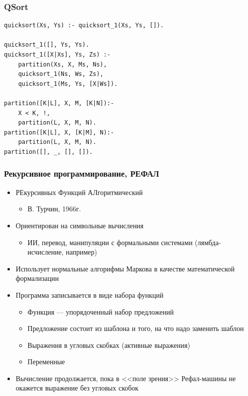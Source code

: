 \documentclass[xetex,mathserif,serif]{beamer}
\begin{document}
    \begin{frame}[fragile]
        \frametitle{QSort}
        \begin{verbatim}
quicksort(Xs, Ys) :- quicksort_1(Xs, Ys, []).

quicksort_1([], Ys, Ys).
quicksort_1([X|Xs], Ys, Zs) :-
    partition(Xs, X, Ms, Ns),
    quicksort_1(Ns, Ws, Zs),
    quicksort_1(Ms, Ys, [X|Ws]).
 
partition([K|L], X, M, [K|N]):-
    X < K, !,
    partition(L, X, M, N).
partition([K|L], X, [K|M], N):-
    partition(L, X, M, N).
partition([], _, [], []).
        \end{verbatim}
    \end{frame}

    \begin{frame}
        \frametitle{Рекурсивное программирование, РЕФАЛ}
        \begin{itemize}
            \item РЕкурсивных Функций АЛгоритмический
            \begin{itemize}
                \item В. Турчин, 1966г.
            \end{itemize}
            \item Ориентирован на символьные вычисления
            \begin{itemize}
                \item ИИ, перевод, манипуляции с формальными системами (лямбда-исчисление, например)
            \end{itemize}
            \item Использует нормальные алгорифмы Маркова в качестве математической формализации
            \item Программа записывается в виде набора функций
            \begin{itemize}
                \item Функция --- упорядоченный набор предложений
                \item Предложение состоит из шаблона и того, на что надо заменить шаблон
                \item Выражения в угловых скобках (активные выражения)
                \item Переменные
            \end{itemize}
            \item Вычисление продолжается, пока в <<поле зрения>> Рефал-машины не окажется выражение без угловых скобок
        \end{itemize}
    \end{frame}
\end{document}
